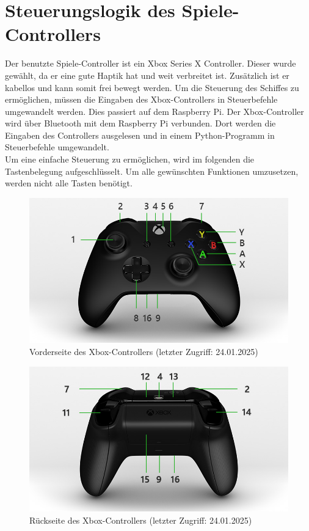 \section{Steuerungslogik des Spiele-Controllers} \label{sec:steuerungslogik}
Der benutzte Spiele-Controller ist ein Xbox Series X Controller. Dieser wurde gewählt, da er eine gute Haptik hat und weit
verbreitet ist. Zusätzlich ist er kabellos und kann somit frei bewegt werden. Um die Steuerung des Schiffes zu
ermöglichen, müssen die Eingaben des Xbox-Controllers in Steuerbefehle umgewandelt werden. Dies passiert auf dem 
Raspberry Pi. Der Xbox-Controller wird über Bluetooth mit dem Raspberry Pi verbunden. Dort werden die Eingaben des Controllers
ausgelesen und in einem Python-Programm in Steuerbefehle umgewandelt. \\
Um eine einfache Steuerung zu ermöglichen, wird im folgenden die Tastenbelegung aufgeschlüsselt.
Um alle gewünschten Funktionen umzusetzen, werden nicht alle Tasten benötigt. 

\begin{figure}[H]
    \centering
    \includegraphics[scale=0.5]{images/vorderseite.jpg}
    \caption{Vorderseite des Xbox-Controllers \cite{XboxController}(letzter Zugriff: 24.01.2025)}
    \label{fig:vorderseite}
\end{figure}

\begin{figure}[H]
    \centering
    \includegraphics[scale=0.5]{images/rueckseite.jpg}
    \caption{Rückseite des Xbox-Controllers \cite{XboxController}(letzter Zugriff: 24.01.2025)}
    \label{fig:rueckseite}
\end{figure}

